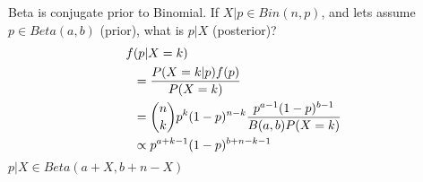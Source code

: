 \begin{slidemaximus}
  \begin{multicols*}{3}
Beta is conjugate prior to Binomial. If $X|p \in Bin(n,p)$, and lets assume $p \in Beta(a,b)$ (prior), what is $p|X$ (posterior)? 
\begin{align*}
f&(p| X=k) 
\\
&= {P(X=k|p)f(p) \over P(X=k)} 
\\
&= { n\choose k} p^k(1-p)^{n-k} {p^{a-1}(1-p)^{b-1} \over B(a,b) P(X=k)} 
\\
&\propto p^{a+k-1}(1-p)^{b+n-k-1}
\end{align*}
$p|X \in Beta (a+X,b+n-X)$
\vfill
  \end{multicols*}
\end{slidemaximus}
